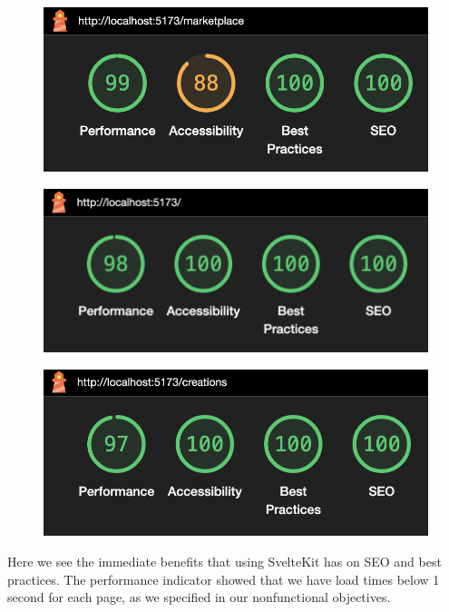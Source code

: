 \documentclass[12pt,a4paper]{article}
\begin{document}
\begin{figure}[H]
    \centering
    \includegraphics[scale=0.4]{l2.png}
\end{figure}\begin{figure}[H]
    \centering
    \includegraphics[scale=0.4]{l3.png}
\end{figure}\begin{figure}[H]
    \centering
    \includegraphics[scale=0.4]{l4.png}
\end{figure}

\noindent Here we see the immediate benefits that using SvelteKit has on SEO and best practices. The performance indicator showed that we have load times below 1 second for each page, as we specified in our nonfunctional objectives.
\end{document}
